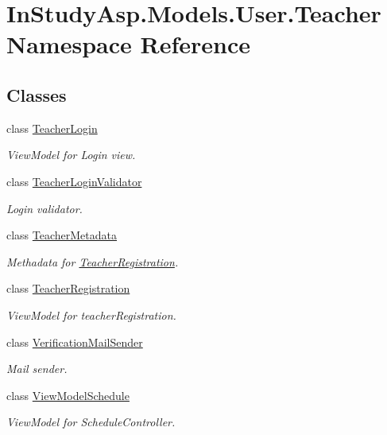 \hypertarget{namespace_in_study_asp_1_1_models_1_1_user_1_1_teacher}{}\section{In\+Study\+Asp.\+Models.\+User.\+Teacher Namespace Reference}
\label{namespace_in_study_asp_1_1_models_1_1_user_1_1_teacher}
\subsection*{Classes}
\begin{DoxyCompactItemize}
\item 
class \hyperlink{class_in_study_asp_1_1_models_1_1_user_1_1_teacher_1_1_teacher_login}{Teacher\+Login}
\begin{DoxyCompactList}\small\item\em View\+Model for Login view. \end{DoxyCompactList}\item 
class \hyperlink{class_in_study_asp_1_1_models_1_1_user_1_1_teacher_1_1_teacher_login_validator}{Teacher\+Login\+Validator}
\begin{DoxyCompactList}\small\item\em Login validator. \end{DoxyCompactList}\item 
class \hyperlink{class_in_study_asp_1_1_models_1_1_user_1_1_teacher_1_1_teacher_metadata}{Teacher\+Metadata}
\begin{DoxyCompactList}\small\item\em Methadata for \hyperlink{class_in_study_asp_1_1_models_1_1_user_1_1_teacher_1_1_teacher_registration}{Teacher\+Registration}. \end{DoxyCompactList}\item 
class \hyperlink{class_in_study_asp_1_1_models_1_1_user_1_1_teacher_1_1_teacher_registration}{Teacher\+Registration}
\begin{DoxyCompactList}\small\item\em View\+Model for teacher\+Registration. \end{DoxyCompactList}\item 
class \hyperlink{class_in_study_asp_1_1_models_1_1_user_1_1_teacher_1_1_verification_mail_sender}{Verification\+Mail\+Sender}
\begin{DoxyCompactList}\small\item\em Mail sender. \end{DoxyCompactList}\item 
class \hyperlink{class_in_study_asp_1_1_models_1_1_user_1_1_teacher_1_1_view_model_schedule}{View\+Model\+Schedule}
\begin{DoxyCompactList}\small\item\em View\+Model for Schedule\+Controller. \end{DoxyCompactList}\end{DoxyCompactItemize}

